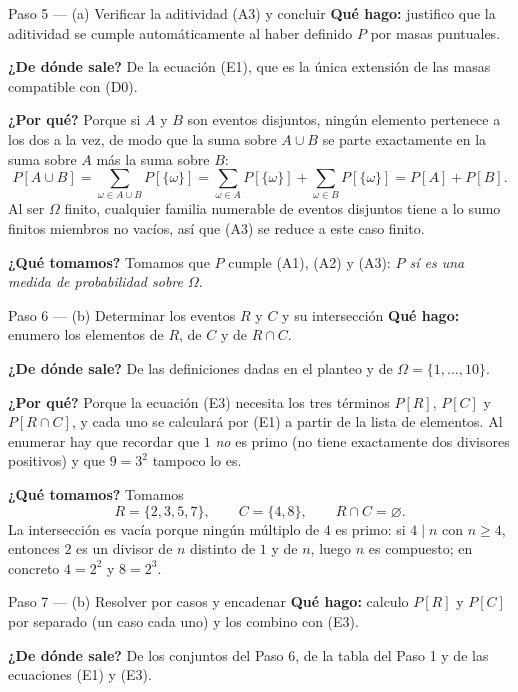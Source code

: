 \documentclass[11pt]{article}
\begin{document}
\begin{sol}
\begin{paso}{Paso 5 --- (a) Verificar la aditividad (A3) y concluir}
\textbf{Qué hago:} justifico que la aditividad se cumple automáticamente al haber definido $P$
por masas puntuales.

\textbf{¿De dónde sale?} De la ecuación (E1), que es la única extensión de las masas compatible
con (D0).

\textbf{¿Por qué?} Porque si $A$ y $B$ son eventos disjuntos, ningún elemento pertenece a los
dos a la vez, de modo que la suma sobre $A\cup B$ se parte exactamente en la suma sobre $A$ más
la suma sobre $B$:
\[
P[A\cup B]=\sum_{\omega\in A\cup B}P[\{\omega\}]
=\sum_{\omega\in A}P[\{\omega\}]+\sum_{\omega\in B}P[\{\omega\}]=P[A]+P[B].
\]
Al ser $\Omega$ finito, cualquier familia numerable de eventos disjuntos tiene a lo sumo
finitos miembros no vacíos, así que (A3) se reduce a este caso finito.

\textbf{¿Qué tomamos?} Tomamos que $P$ cumple (A1), (A2) y (A3): \emph{$P$ sí es una medida de
probabilidad sobre $\Omega$}.
\end{paso}

\begin{paso}{Paso 6 --- (b) Determinar los eventos $R$ y $C$ y su intersección}
\textbf{Qué hago:} enumero los elementos de $R$, de $C$ y de $R\cap C$.

\textbf{¿De dónde sale?} De las definiciones dadas en el planteo y de $\Omega=\{1,\dots,10\}$.

\textbf{¿Por qué?} Porque la ecuación (E3) necesita los tres términos $P[R]$, $P[C]$ y
$P[R\cap C]$, y cada uno se calculará por (E1) a partir de la lista de elementos. Al enumerar
hay que recordar que $1$ \emph{no} es primo (no tiene exactamente dos divisores positivos) y que
$9=3^{2}$ tampoco lo es.

\textbf{¿Qué tomamos?} Tomamos
\[
R=\{2,3,5,7\},\qquad C=\{4,8\},\qquad R\cap C=\varnothing .
\]
La intersección es vacía porque ningún múltiplo de $4$ es primo: si $4\mid n$ con $n\ge 4$,
entonces $2$ es un divisor de $n$ distinto de $1$ y de $n$, luego $n$ es compuesto; en concreto
$4=2^{2}$ y $8=2^{3}$.
\end{paso}

\begin{paso}{Paso 7 --- (b) Resolver por casos y encadenar}
\textbf{Qué hago:} calculo $P[R]$ y $P[C]$ por separado (un caso cada uno) y los combino con
(E3).

\textbf{¿De dónde sale?} De los conjuntos del Paso 6, de la tabla del Paso 1 y de las ecuaciones
(E1) y (E3).


\end{paso}
\end{sol}
\end{document}
